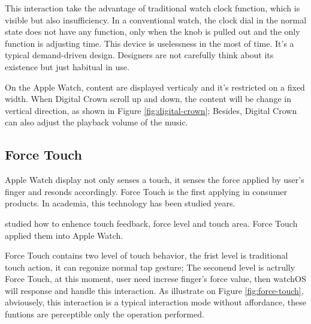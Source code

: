 This interaction take the advantage of traditional watch clock function, which is visible but also insufficiency.
In a conventional watch, the clock dial in the normal state does not have any function, only when the knob is pulled out and the only function is adjusting time. This device is uselessness in the most of time. It's a typical demand-driven design. Designers are not carefully think about its existence but just habitual in use.

On the Apple Watch, content are displayed verticaly and it's restricted on a fixed width.
When Digital Crown scroll up and down, the content will be change in vertical direction, as shown in Figure \ref{fig:digital-crown}; Besides, Digital Crown can also adjust the playback volume of the music.

\subsection{Force Touch}

Apple Watch display not only senses a touch, it senses the force applied by user's finger and resonds accordingly. Force Touch is the first applying in consumer products. In academia, this technology has been studied years.

\cite{Boring:2012ea,Buschek:2015cd,Vogel:2007:STO:1240624.1240727} studied how to enhence touch feedback, force level and touch area. Force Touch applied them into Apple Watch.

Force Touch contains two level of touch behavior, the frist level is traditional touch action, it can regonize normal tap gesture;
The seconend level is actrully Force Touch, at this moment, user need increse finger's force value, then watchOS will response and handle this interaction.
As illustrate on Figure \ref{fig:force-touch}, abviousely, this interaction is a typical interaction mode without affordance, these funtions are perceptible only the operation performed.

